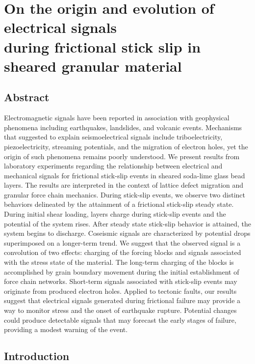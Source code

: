 \chapter{On the origin and evolution of electrical signals\\ during frictional stick slip in sheared granular material}

\section{Abstract}
Electromagnetic signals have been reported in association with geophysical phenomena including earthquakes, landslides, and volcanic events. Mechanisms that suggested to explain seismoelectrical signals include triboelectricity, piezoelectricity, streaming potentials, and the migration
of electron holes, yet the origin of such phenomena remains poorly understood. We present results from laboratory experiments regarding the relationship between electrical and mechanical signals for frictional stick-slip events in sheared soda-lime glass bead layers. The results are interpreted in the context of lattice defect migration and granular force chain mechanics. During stick-slip events, we observe two distinct behaviors delineated by the attainment of a frictional stick-slip steady state. During initial shear loading, layers charge during stick-slip events and the potential of the system rises. After steady state stick-slip behavior is attained, the system begins to discharge. Coseismic signals are characterized by potential drops superimposed on a longer-term trend. We suggest that the observed signal is a convolution of two effects: charging of the forcing blocks and signals associated with the stress state of the material. The long-term charging of the blocks is accomplished by grain boundary movement during the initial establishment of force chain networks. Short-term signals associated with stick-slip events may originate from produced electron holes. Applied to tectonic faults, our results suggest that electrical signals generated during frictional failure may provide a way to monitor stress and the onset of earthquake rupture. Potential changes could produce detectable signals that may forecast the early stages of failure, providing a modest warning of the event.

%
%

\section{Introduction}

